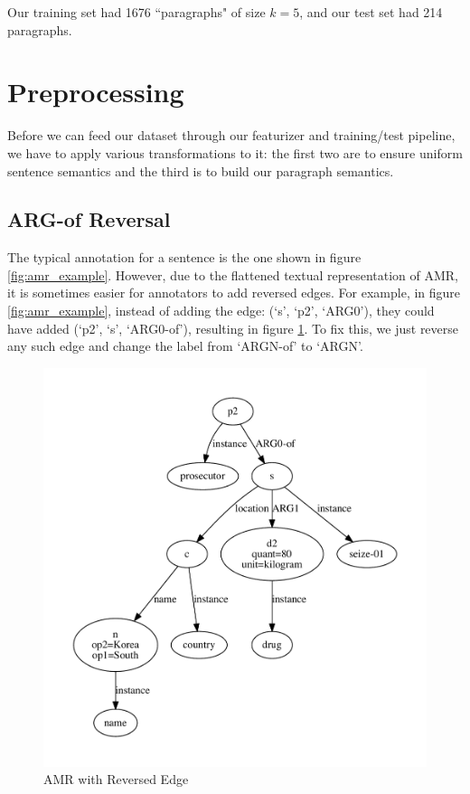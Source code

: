 \documentclass[12pt]{article}
\begin{document}
Our training set had 1676 ``paragraphs" of size $k=5$, and our test set had 214
paragraphs.

\section{Preprocessing}
Before we can feed our dataset through our featurizer and training/test pipeline, we have to apply various transformations to it: the first two are to ensure uniform sentence semantics and the third is to build our paragraph semantics.

\subsection{ARG-of Reversal}
The typical annotation for a sentence is the one shown in figure \ref{fig:amr_example}. However, due to the flattened textual representation of AMR, it is sometimes easier for annotators to add reversed edges. For example, in figure \ref{fig:amr_example}, instead of adding the edge: (`s', `p2', `ARG0'), they could have added (`p2', `s', `ARG0-of'), resulting in figure \ref{fig:amr_example_argof}. To fix this, we just reverse any such edge and change the label from `ARGN-of' to `ARGN'.

\begin{figure}
\includegraphics[width=\linewidth]{amr_example_argof.pdf}
\caption{AMR with Reversed Edge}
\label{fig:amr_example_argof}
\end{figure}
\end{document}
